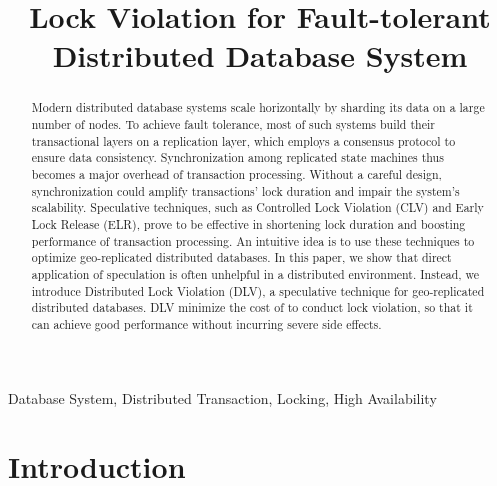\documentclass[conference]{IEEEtran}
\begin{document}
\title{Lock Violation for Fault-tolerant Distributed Database System}


\author{
\and
{}
}

\maketitle

\begin{abstract}
Modern distributed database systems scale horizontally by sharding its data on a large number of nodes.
To achieve fault tolerance, most of such systems build their transactional layers on a replication layer,
which employs a consensus protocol to ensure data consistency.
Synchronization among replicated state machines thus becomes a major overhead of transaction processing.
Without a careful design, synchronization could amplify transactions' lock duration and impair the system's scalability.
Speculative techniques, such as Controlled Lock Violation (CLV) and Early Lock Release (ELR), prove to be effective in shortening lock duration and boosting performance of transaction processing.
An intuitive idea is to use these techniques to optimize geo-replicated distributed databases.
In this paper, we show that direct application of speculation is often unhelpful in a distributed environment.
Instead, we introduce Distributed Lock Violation (DLV), a speculative technique for geo-replicated distributed databases.
DLV minimize the cost of to conduct lock violation, so that it can achieve good performance without incurring severe side effects.
\end{abstract}

\begin{IEEEkeywords}
Database System, Distributed Transaction, Locking, High Availability
\end{IEEEkeywords}

\section{Introduction}
\end{document}
